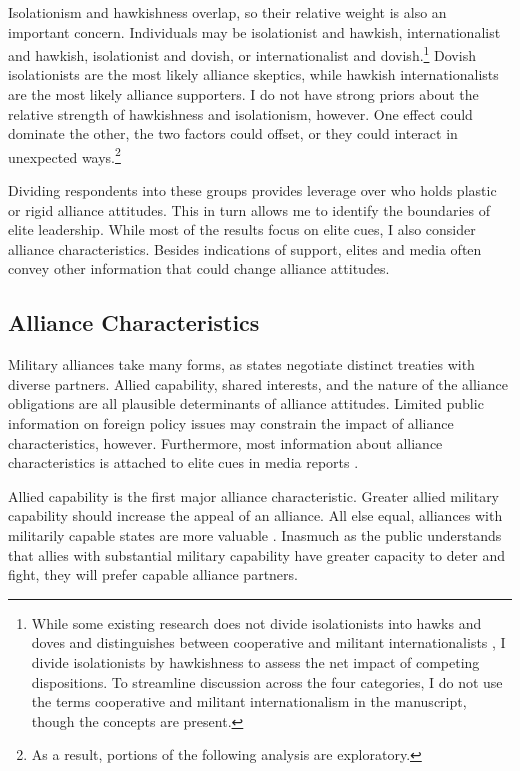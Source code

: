 \documentclass[12pt]{article}
\begin{document}
Isolationism and hawkishness overlap, so their relative weight is also an important concern.
Individuals may be isolationist and hawkish, internationalist and hawkish, isolationist and dovish, or internationalist and dovish.\footnote{While some existing research does not divide isolationists into hawks and doves and distinguishes between cooperative and militant internationalists \citep{Kertzeretal2014}, I divide isolationists by hawkishness to assess the net impact of competing dispositions. To streamline discussion across the four categories, I do not use the terms cooperative and militant internationalism in the manuscript, though the concepts are present.}  
Dovish isolationists are the most likely alliance skeptics, while hawkish internationalists are the most likely alliance supporters. 
I do not have strong priors about the relative strength of hawkishness and isolationism, however.
One effect could dominate the other, the two factors could offset, or they could interact in unexpected ways.\footnote{As a result, portions of the following analysis are exploratory.}


Dividing respondents into these groups provides leverage over who holds plastic or rigid alliance attitudes. 
This in turn allows me to identify the boundaries of elite leadership. 
While most of the results focus on elite cues, I also consider alliance characteristics. 
Besides indications of support, elites and media often convey other information that could change alliance attitudes.  



\subsection{Alliance Characteristics}


Military alliances take many forms, as states negotiate distinct treaties with diverse partners.
Allied capability, shared interests, and the nature of the alliance obligations are all plausible determinants of alliance attitudes.   
Limited public information on foreign policy issues may constrain the impact of alliance characteristics, however. 
Furthermore, most information about alliance characteristics is attached to elite cues in media reports \citep{BaumPotter2008}. 


Allied capability is the first major alliance characteristic.
Greater allied military capability should increase the appeal of an alliance. 
All else equal, alliances with militarily capable states are more valuable \citep{Johnsonetal2015}. 
Inasmuch as the public understands that allies with substantial military capability have greater capacity to deter and fight, they will prefer capable alliance partners. 
\end{document}
